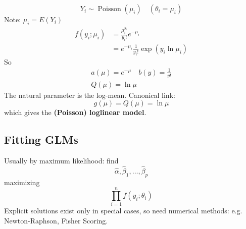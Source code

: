 \documentclass[11pt]{elegantbook}
\begin{document}
\begin{example}
    $$
    Y_i \sim \operatorname{Poisson}\left(\mu_i\right) \quad\left(\theta_i=\mu_i\right)
    $$
    Note: $\mu_i=E\left(Y_i\right)$
    $$
    \begin{aligned}
    f\left(y_i ; \mu_i\right) & =\frac{\mu_i^{y_i}}{y_{i} !} e^{-\mu_i} \\
    & =e^{-\mu_i} \frac{1}{y_{i} !} \exp \left(y_i \ln \mu_i\right)
    \end{aligned}
    $$
    So
    $$
    \begin{gathered}
    a(\mu)=e^{-\mu} \quad b(y)=\frac{1}{y !} \\
    Q(\mu)=\ln \mu
    \end{gathered}
    $$
    The natural parameter is the log-mean.
    Canonical link:
    $$
    g(\mu)=Q(\mu)=\ln \mu
    $$
    which gives the \textbf{(Poisson) loglinear model}.
\end{example}

\subsection{Fitting GLMs}
Usually by maximum likelihood: find
$$
\hat{\alpha}, \hat{\beta}_1, \ldots, \hat{\beta}_p
$$
maximizing
$$
\prod_{i=1}^n f\left(y_i ; \theta_i\right)
$$
Explicit solutions exist only in special cases, so need numerical methods: e.g. Newton-Raphson, Fisher Scoring.
\end{document}
